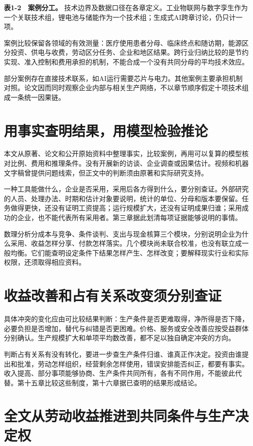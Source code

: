 \documentclass[UTF8,fontset=windows,12pt,a4paper,oneside,openany]{ctexbook}
\begin{document}
\textbf{表1-2　案例分工。} 技术边界及数据口径在各章定义。工业物联网与数字孪生作为一个关联技术组，锂电池与储能作为一个技术组；生成式AI跨章讨论，仍只计一项。

案例比较保留各领域的有效测量：医疗使用患者分母、临床终点和随访期，能源区分投资、供电与收费，劳动区分任务、企业和地区结果。跨行业归纳比较的是节约实现、准入控制和费用承担的机制，不能合成一个没有共同分母的平均技术效应。

部分案例存在直接技术联系，如AI运行需要芯片与电力。其他案例主要承担机制对照。论文因而同时观察企业内部与相关生产网络，不以章节顺序假定十项技术组成一条统一因果链。

\section{用事实查明结果，用模型检验推论}

本文从原著、论文和公开原始资料中整理事实，比较案例，再用可以复算的模型核对比例、费用和推理条件。没有开展新的访谈、企业调查或因果估计。视频和机器文字稿曾提供问题线索，但正文中的判断须由原著和实际研究支持。

一种工具能做什么，企业是否采用，采用后各方得到什么，要分别查证。外部研究的人员、处理办法、时期和估计对象要说明，统计的单位、分母和版本要保留。任务做得更快，还没有证明工资提高；运行规模扩大，还没有证明成果归谁；采用成功的企业，也不能代表所有采用者。第三章据此划清每项证据能够说明的事情。

数理分析分成本与竞争、条件谈判、支出与现金核算三个模块，分别说明企业为什么采用、收益怎样分享、付款怎样落实。几个模块尚未联合校准，也没有联立成一般均衡。它们能查明设定条件下结果怎样产生、怎样改变；要解释现实行业和实际权限，还须取得相应资料。

\section{收益改善和占有关系改变须分别查证}

具体冲突的变化应由可比较结果判断：生产条件是否更难取得，净所得是否下降，必要负担是否增加，替代与纠错是否更困难。价格、服务或安全改善应按受益群体分别确认。生产规模扩大和单项平均数改善，都不足以独自确定冲突的方向。

判断占有关系有没有转化，要进一步查生产条件归谁、谁真正作决定。投资由谁提出和批准，劳动怎样组织，经营剩余怎样使用，错误安排能否纠正，都要有事实。收入提高、部分事项能够协商、生产条件共同所有，各有不同作用，不能彼此代替。第十五章比较这些制度，第十六章据已查明的结果形成结论。

\section{全文从劳动收益推进到共同条件与生产决定权}
\end{document}
